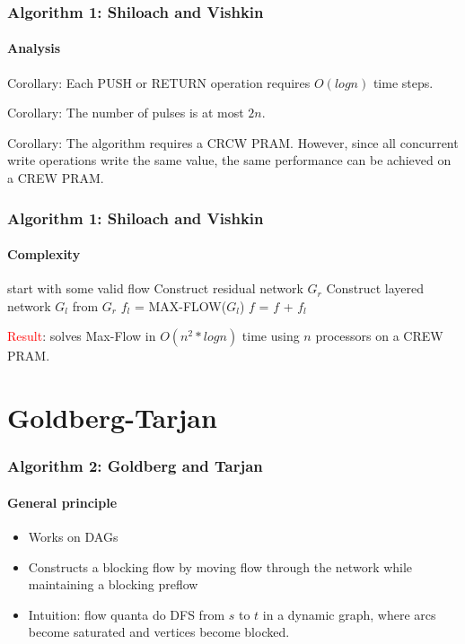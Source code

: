 \documentclass{beamer}
\begin{document}
\begin{frame}
\frametitle{Algorithm 1: Shiloach and Vishkin}
\framesubtitle{Analysis} 
\begin{block}{Corollary:}
Each PUSH or RETURN operation requires $O(log n)$ time steps.
\end{block}
\begin{block}{Corollary:}
The number of pulses is at most $2n$.
\end{block}
\begin{block}{Corollary:}
The algorithm requires a CRCW PRAM. However, since all concurrent write operations write the same value, the same performance can be achieved on a CREW PRAM.
\end{block}

\end{frame}

\begin{frame}
\frametitle{Algorithm 1: Shiloach and Vishkin}
\framesubtitle{Complexity} 
	\begin{algorithmic}[1]
	\State start with some valid flow 
	 \Comment{\textcolor{OliveGreen}{$O(n)$}}	
		\State Construct residual network $G_r$ \Comment{\textcolor{OliveGreen}{$O(n)$, $p=O(n)$}}
		\State Construct layered network $G_l$ from $G_r$ 
		\State $f_l$ = MAX-FLOW($G_l$)  \Comment{\textcolor{OliveGreen}{$O(n * log n)$}}
		\State $f$ = $f$ + $f_l$ \Comment{\textcolor{OliveGreen}{$O(n)$}}
	\EndWhile
	\EndFunction
	\end{algorithmic}
	
\pause
\textcolor{red}{Result}: solves Max-Flow in $O({n}^{2} * log n)$ time using $n$ processors on a CREW PRAM.
\end{frame}

\section{Goldberg-Tarjan}
\begin{frame}
\frametitle{Algorithm 2: Goldberg and Tarjan}
\framesubtitle{General principle}
\begin{itemize}
	\item Works on DAGs
	\item Constructs a blocking flow by moving flow through the network while maintaining a blocking preflow	
	\item Intuition: flow quanta do DFS from $s$ to $t$ in a dynamic graph, where arcs become saturated and vertices become blocked.
\end{itemize} 
\end{frame}
\end{document}
